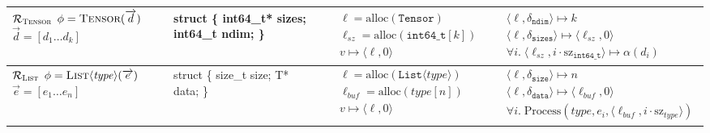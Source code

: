 \begin{table}[htbp]
\begin{tabular}{m{}|m{}|>{\raggedright\arraybackslash}m{}|>{\raggedright\arraybackslash}m{}}
    $\mathcal{R}_{\textsc{Tensor}}$ \newline $\phi=\textsc{Tensor}(\vec{d})$ \newline $\vec{d}=[d_1 \dots d_k]$ &
    {\ttfamily struct \{ \newline \hspace*{0.8em} int64\_t* sizes; \newline \hspace*{0.8em} int64\_t ndim; \newline \}} &
    $\begin{aligned}
      & \ell = \text{alloc}(\texttt{Tensor}) \\
      & \ell_{sz} = \text{alloc}(\texttt{int64\_t}[k]) \\
      & v \mapsto \langle\ell, 0\rangle
    \end{aligned}$ &
    $\begin{aligned}
      & \langle \ell, \delta_{\texttt{ndim}} \rangle \mapsto k \\
      & \langle \ell, \delta_{\texttt{sizes}} \rangle \mapsto \langle\ell_{sz}, 0\rangle \\
      & \forall i.\; \langle \ell_{sz}, i \cdot \text{sz}_{\texttt{int64\_t}} \rangle \mapsto \alpha(d_i)
    \end{aligned}$
    \\ \hline
    
    $\mathcal{R}_{\textsc{List}}$ \newline $\phi=\textsc{List}\langle\mathit{type}\rangle(\vec{e})$ \newline $\vec{e}=[e_1 \dots e_n]$ &
    {\ttfamily struct \{ \newline \hspace*{0.8em} size\_t size; \newline \hspace*{0.8em} T* data; \newline \}} &
    $\begin{aligned}
      & \ell = \text{alloc}(\texttt{List}\langle\mathit{type}\rangle) \\
      & \ell_{buf} = \text{alloc}(\mathit{type}[n]) \\
      & v \mapsto \langle\ell, 0\rangle
    \end{aligned}$ &
    $\begin{aligned}
      & \langle \ell, \delta_{\texttt{size}} \rangle \mapsto n \\
      & \langle \ell, \delta_{\texttt{data}}\rangle \mapsto \langle\ell_{buf}, 0\rangle \\
      & \forall i. \; \text{Process}(\mathit{type}, e_i, \langle \ell_{buf}, i \cdot \text{sz}_{\mathit{type}} \rangle)
    \end{aligned}$
    \\ \hline
    

\end{tabular}
\end{table}
